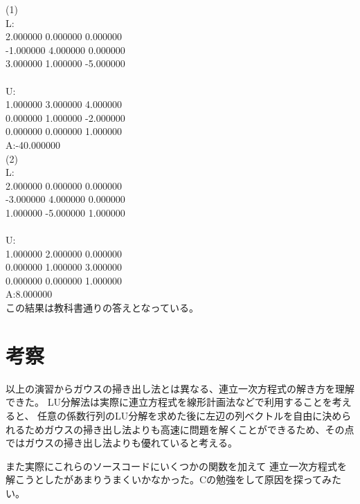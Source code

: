 \documentclass[a4paper,11pt]{jsarticle}
\begin{document}
(1)\\
L: \\
   2.000000   0.000000   0.000000\\
  -1.000000   4.000000   0.000000\\
   3.000000   1.000000  -5.000000\\
\\
U:\\
   1.000000   3.000000   4.000000\\
   0.000000   1.000000  -2.000000\\
   0.000000   0.000000   1.000000\\
A:-40.000000\\

(2)\\
L: \\
   2.000000   0.000000   0.000000\\
  -3.000000   4.000000   0.000000\\
   1.000000  -5.000000   1.000000\\
\\
U:\\
   1.000000   2.000000   0.000000\\
   0.000000   1.000000   3.000000\\
   0.000000   0.000000   1.000000\\
A:8.000000\\

この結果は教科書通りの答えとなっている。

\section{考察}
以上の演習からガウスの掃き出し法とは異なる、連立一次方程式の解き方を理解できた。
LU分解法は実際に連立方程式を線形計画法などで利用することを考えると、
任意の係数行列のLU分解を求めた後に左辺の列ベクトルを自由に決められるためガウスの掃き出し法よりも高速に問題を解くことができるため、その点ではガウスの掃き出し法よりも優れていると考える。

また実際にこれらのソースコードにいくつかの関数を加えて
連立一次方程式を解こうとしたがあまりうまくいかなかった。Cの勉強をして原因を探ってみたい。
\end{document}
